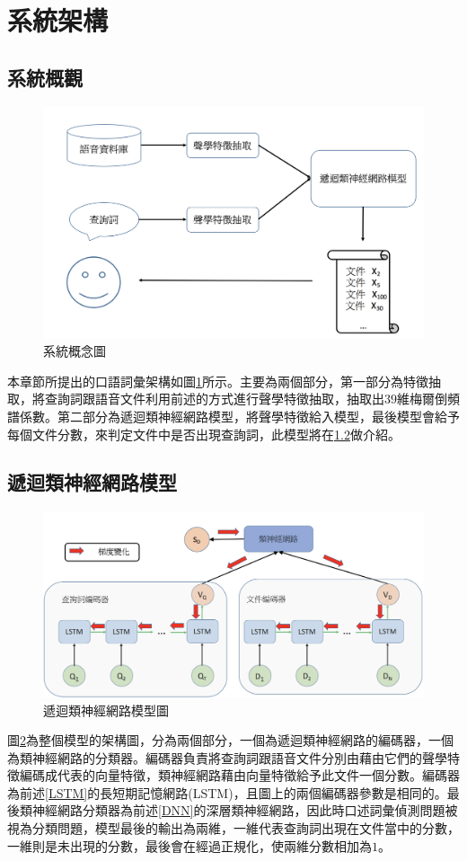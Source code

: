 \section{系統架構}
\subsection{系統概觀}
\begin{figure}[h]
\centering
\includegraphics[scale=0.4]{images/ch3_system.png} 
\caption{系統概念圖}
\label{ch3_system}
\end{figure}
本章節所提出的口語詞彙架構如圖\ref{ch3_system}所示。主要為兩個部分，第一部分為特徵抽取，將查詢詞跟語音文件利用前述的方式進行聲學特徵抽取，抽取出$39$維梅爾倒頻譜係數。第二部分為遞迴類神經網路模型，將聲學特徵給入模型，最後模型會給予每個文件分數，來判定文件中是否出現查詢詞，此模型將在\ref{rnn_model}做介紹。
\subsection{遞迴類神經網路模型}
\label{rnn_model}
\begin{figure}[ht]
\centering
\includegraphics[scale=0.4]{images/ch3_RNN_model_g.png} 
\caption{遞迴類神經網路模型圖}
\label{ch3_RNN_model}
\end{figure}
圖\ref{ch3_RNN_model}為整個模型的架構圖，分為兩個部分，一個為遞迴類神經網路的編碼器，一個為類神經網路的分類器。編碼器負責將查詢詞跟語音文件分別由藉由它們的聲學特徵編碼成代表的向量特徵，類神經網路藉由向量特徵給予此文件一個分數。編碼器為前述\ref{LSTM}的長短期記憶網路(LSTM)，且圖上的兩個編碼器參數是相同的。最後類神經網路分類器為前述\ref{DNN}的深層類神經網路，因此時口述詞彙偵測問題被視為分類問題，模型最後的輸出為兩維，一維代表查詢詞出現在文件當中的分數，一維則是未出現的分數，最後會在經過正規化，使兩維分數相加為$1$。

